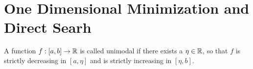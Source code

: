 
\newpage
\section{One Dimensional Minimization and Direct Searh}


\label{def:unimodal_fnc}
A function \( f : [a,b] \to \mathbb{R} \) is called unimodal if there exists a \( \eta \in \mathbb{R} \), so that
\( f \) is strictly decreasing in \( [a, \eta] \) and is strictly increasing in \( [\eta, b] \).

